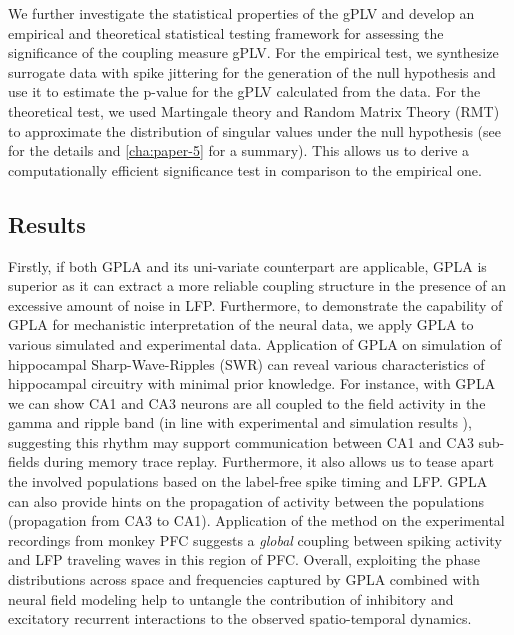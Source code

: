 We further investigate the statistical properties of the gPLV and develop an empirical and theoretical statistical testing framework for assessing the significance of the coupling measure gPLV.
For the empirical test, we synthesize surrogate data with spike jittering for the generation of the null hypothesis and use it to estimate the p-value for the gPLV calculated from the data.
For the theoretical test, we used Martingale theory and \cite{aalenSurvivalEventHistory2008}
Random Matrix Theory (RMT) \citep{andersonIntroductionRandomMatrices2010}
to approximate the distribution of singular values under the null hypothesis (see \citet{safaviUnivariateMultivariateCoupling2020} for the details and \autoref{cha:paper-5} for a summary).
This allows us to derive a computationally efficient significance test in comparison to the empirical one.

\subsection*{Results}
Firstly, if both GPLA and its uni-variate counterpart are applicable,
GPLA is superior as it can extract a more reliable  coupling structure in the presence
of an excessive amount of noise in LFP.
Furthermore, to demonstrate the capability of GPLA for mechanistic
interpretation of the neural data,
we apply GPLA to various simulated and experimental data.
Application of GPLA on simulation of hippocampal
Sharp-Wave-Ripples (SWR) can reveal various characteristics of hippocampal circuitry with minimal prior knowledge.
For instance, with GPLA we can show CA1 and CA3 neurons are all coupled to the field activity in the gamma and ripple band
(in line with experimental and simulation results 
\citep{buzsakiHighfrequencyNetworkOscillation1992,ramirez-villegasDissectingSynapseFrequencyDependent2018}),
suggesting this rhythm may support communication between CA1 and CA3 sub-fields during memory trace replay. 
Furthermore, it also allows us to tease apart the involved populations based on the label-free spike timing and LFP.
GPLA can also provide hints on the propagation of activity between the populations (propagation from CA3 to CA1).
Application of the method on the experimental recordings from monkey PFC suggests a \emph{global} coupling between spiking activity and LFP traveling waves in this region of PFC.
Overall, exploiting the phase distributions across space and frequencies captured by GPLA combined with neural field modeling help to untangle the contribution of inhibitory and excitatory recurrent interactions to the observed spatio-temporal dynamics.

